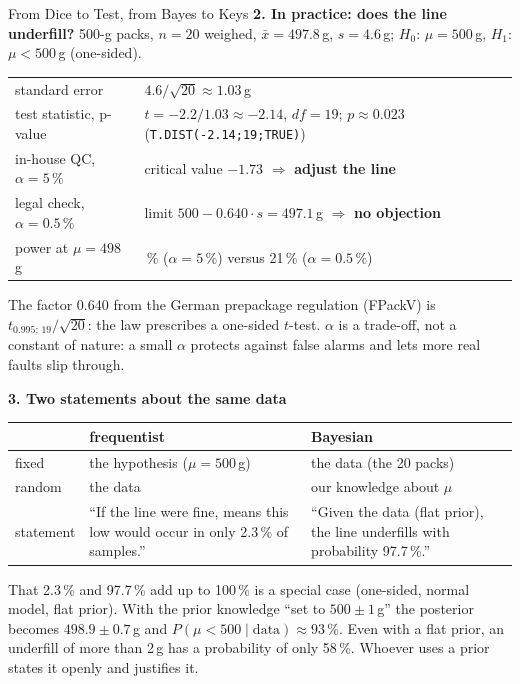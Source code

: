 \begin{handout}{From Dice to Test, from Bayes to Keys}
\textbf{2. In practice: does the line underfill?} 500-g packs, $n=20$
weighed, $\bar{x}=497.8$\,g, $s=4.6$\,g; $H_0$: $\mu=500$\,g,
$H_1$: $\mu<500$\,g (one-sided).
\begin{center}
\small
\begin{tabular}{@{}>{\raggedright\arraybackslash}p{}>{\raggedright\arraybackslash}p{}@{}}
\toprule
standard error & $4.6/\sqrt{20}\approx1.03$\,g \\
test statistic, p-value & $t=-2.2/1.03\approx-2.14$, $\mathit{df}=19$; $p\approx0.023$ (\texttt{T.DIST(-2.14;19;TRUE)}) \\
in-house QC, $\alpha=5\,\%$ & critical value $-1.73$ $\Rightarrow$ \textbf{adjust the line} \\
legal check, $\alpha=0.5\,\%$ & limit $500-0.640\cdot s=497.1$\,g $\Rightarrow$ \textbf{no objection} \\
power at $\mu=498$\,g & 59\,\% ($\alpha=5\,\%$) versus 21\,\% ($\alpha=0.5\,\%$) \\
\bottomrule
\end{tabular}
\end{center}
The factor 0.640 from the German prepackage regulation (FPackV) is
$t_{0.995;\,19}/\sqrt{20}$: the law prescribes a one-sided $t$-test.
$\alpha$ is a trade-off, not a constant of nature: a small $\alpha$
protects against false alarms and lets more real faults slip through.

\textbf{3. Two statements about the same data}
\begin{center}
\small
\begin{tabular}{@{}>{\raggedright\arraybackslash}p{}>{\raggedright\arraybackslash}p{}>{\raggedright\arraybackslash}p{}@{}}
\toprule
 & \textbf{frequentist} & \textbf{Bayesian} \\
\midrule
fixed & the hypothesis ($\mu=500$\,g) & the data (the 20 packs) \\
random & the data & our knowledge about $\mu$ \\
statement & \enquote{If the line were fine, means this low would occur in only 2.3\,\% of samples.} & \enquote{Given the data (flat prior), the line underfills with probability 97.7\,\%.} \\
\bottomrule
\end{tabular}
\end{center}
That 2.3\,\% and 97.7\,\% add up to 100\,\% is a special case (one-sided,
normal model, flat prior). With the prior knowledge \enquote{set to
$500\pm1$\,g} the posterior becomes $498.9\pm0.7$\,g and
$P(\mu<500\mid\text{data})\approx93\,\%$. Even with a flat prior, an
underfill of more than 2\,g has a probability of only 58\,\%. Whoever uses
a prior states it openly and justifies it.


\end{handout}
